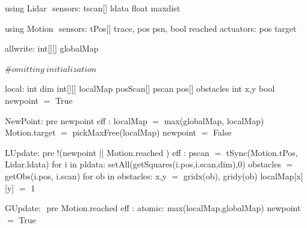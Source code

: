 using Lidar $\label{lidardef}$
    sensors:
       tscan[] ldata 
       float maxdist

using Motion $\label{moddef}$
    sensors:
        tPos[] trace, pos psn,
        bool reached
    actuators:
       pos target

allwrite:$\label{awvar}$
    int[][] globalMap 
    
#$\mathit{omitting\ initialization}$

local:
   int dim
   int[][] localMap 
   posScan[] pscan
   pos[] obstacles
   int x,y
   bool newpoint $=$ True
   
NewPoint:$\label{newpt}$
  pre newpoint
  eff : localMap $=$ max(globalMap, localMap)
        Motion.target $=$ pickMaxFree(localMap)
        newpoint $=$ False

LUpdate:$\label{lup}$
   pre !(newpoint || Motion.reached )
   eff : pscan $=$ tSync(Motion.tPos, Lidar.ldata)
         for i in pldata:
           setAll(getSquares(i.pos,i.scan,dim),0)
             obstacles $=$ getObs(i.pos, i.scan)
             for ob in obstacles:
                 x,y $=$ gridx(ob), gridy(ob)
                 localMap[x][y] $=$ 1
    
GUpdate: $\label{gup}$
  pre Motion.reached
  eff : atomic:
           max(localMap,globalMap)
        newpoint $=$ True
      


